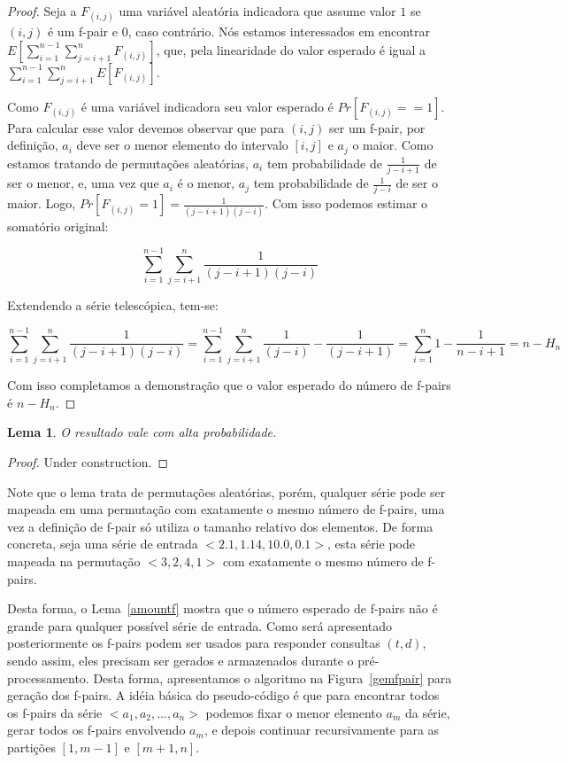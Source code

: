 \documentclass[12pt]{article}
\newtheorem{lem}[thm]{Lema}
\begin{document}
\begin{proof}
Seja a $F_{(i, j)}$ uma variável aleatória indicadora que assume valor
$1$ se $(i, j)$ é um f-pair e $0$, caso contrário. Nós estamos interessados
em encontrar $E[\sum_{i = 1}^{n-1} \sum_{j=i + 1}^n F_{(i, j)}]$, que, pela linearidade
do valor esperado é igual a $\sum_{i = 1}^{n-1} \sum_{j = i + 1}^n E[F_{(i, j)}]$.  

Como $F_{(i, j)}$ é uma variável indicadora seu valor esperado é $Pr[F_{(i,j)} == 1]$.
Para calcular esse valor devemos observar que para $(i, j)$ ser um f-pair, por definição,
$a_i$ deve ser o menor elemento do intervalo $[i, j]$ e $a_j$ o maior. Como estamos
tratando de permutações aleatórias, $a_i$ tem probabilidade de $\frac{1}{j - i + 1}$ de
ser o menor, e, uma vez que $a_i$ é o menor, $a_j$ tem probabilidade de $\frac{1}{j - i}$ de
ser o maior. Logo, $Pr[F_{(i, j)} = 1] = \frac{1}{(j - i + 1) (j - i)}$. Com isso podemos
estimar o somatório original:

$$\sum_{i = 1}^{n-1} \sum_{j = i + 1}^n  \frac{1}{(j - i + 1) (j - i)}$$

Extendendo a série telescópica, tem-se:

$$\sum_{i = 1}^{n-1} \sum_{j = i + 1}^n  \frac{1}{(j - i + 1) (j - i)} = \sum_{i = 1}^{n-1} \sum_{j = i + 1}^n  \frac{1}{(j - i)} - \frac{1}{(j - i + 1)} = \sum_{i = 1}^n 1 - \frac{1}{n - i + 1} = n - H_n $$

Com isso completamos a demonstração que o valor esperado do número de f-pairs é $n - H_n$.
\end{proof}

\begin{lem}
O resultado vale com alta probabilidade.
\end{lem}

\begin{proof}
Under construction.
\end{proof}

Note que o lema trata de permutações aleatórias, porém, qualquer série
pode ser mapeada em uma permutação com exatamente o mesmo número de f-pairs,
uma vez a definição de f-pair só utiliza o tamanho relativo dos elementos.
De forma concreta, seja uma série de entrada $<2.1, 1.14, 10.0, 0.1>$, 
esta série pode mapeada na permutação $<3, 2, 4, 1>$ com exatamente o mesmo número de
f-pairs.

Desta forma, o Lema~\ref{amountf} mostra que o número esperado de f-pairs não é grande
para qualquer possível série de entrada. Como será apresentado posteriormente os f-pairs podem ser usados para responder
consultas $(t, d)$, sendo assim, eles precisam ser gerados e armazenados
durante o pré-processamento. Desta forma, apresentamos o algoritmo na Figura~\ref{gemfpair} para geração
dos f-pairs. A idéia básica do pseudo-código é que para encontrar todos os f-pairs da
série $<a_1, a_2, \ldots, a_n>$ podemos fixar o menor elemento $a_m$ da série,
gerar todos os f-pairs envolvendo $a_m$, e depois continuar recursivamente para as partições $[1, m - 1]$ e $[m + 1, n]$.
\end{document}
